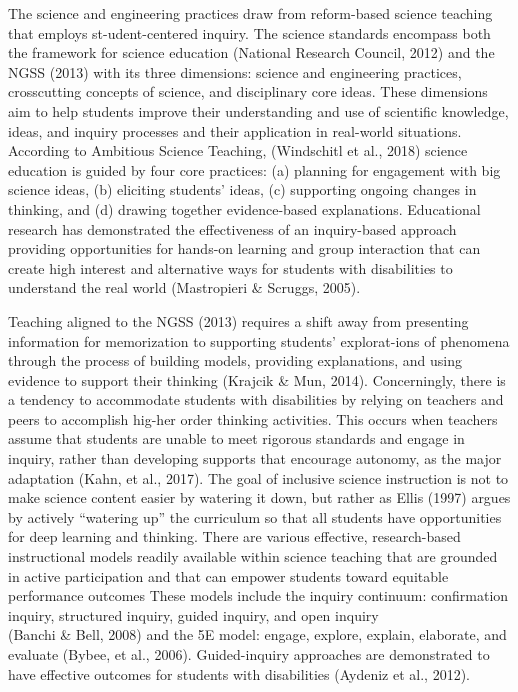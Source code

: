 \documentclass[11.5pt]{sig-alternate}
\begin{document}
\begin{large}
 The science and engineering practices draw from reform-based science teaching that employs st-udent-centered inquiry. The science standards encompass both the framework for science education (National Research Council, 2012) and the NGSS (2013) with its three dimensions: science and engineering practices, crosscutting concepts of science, and disciplinary core ideas. These dimensions aim to help students improve their understanding and use of scientific knowledge, ideas, and inquiry processes and their application in real-world situations. According to Ambitious Science Teaching, (Windschitl et al., 2018) science education is guided by four core practices: (a) planning for engagement with big science ideas, (b) eliciting students’ ideas, (c) supporting ongoing changes in thinking, and (d) drawing together evidence-based explanations. Educational research has demonstrated the effectiveness of an inquiry-based approach providing opportunities for hands-on learning and group interaction that can create high interest and alternative ways for students with disabilities to understand the real world (Mastropieri \& Scruggs, 2005).
	
 Teaching aligned to the NGSS (2013) requires a shift away from presenting information for memorization to supporting students’ explorat-ions of phenomena through the process of building models, providing explanations, and using evidence to support their thinking (Krajcik \& Mun, 2014). Concerningly, there is a tendency to accommodate students with disabilities by relying on teachers and peers to accomplish hig-her order thinking activities. This occurs when teachers assume that students are unable to meet rigorous standards and engage in inquiry, rather than developing supports that encourage autonomy, as the major adaptation (Kahn, et al., 2017). The goal of inclusive science instruction is not to make science content easier by watering it down, but rather as Ellis (1997) argues by actively “watering up” the curriculum so that all students have opportunities for deep learning and thinking. There are various effective, research-based instructional models readily available within science teaching that are grounded in active participation and that can empower students toward equitable performance outcomes These models include the inquiry continuum: confirmation inquiry, structured inquiry, guided inquiry, and open inquiry \\(Banchi \& Bell, 2008) and the 5E model: engage, explore, explain, elaborate, and evaluate (Bybee, et al., 2006). Guided-inquiry approaches are demonstrated to have effective outcomes for students with disabilities (Aydeniz et al., 2012). 
	

\end{large}
\end{document}
